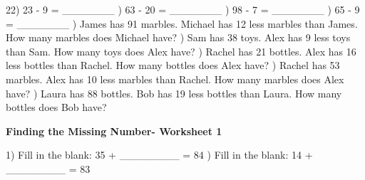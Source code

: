 \documentclass{article}%
\begin{document}
22) 23 {-} 9 = \_\_\_\_\_\_\_%
\newline%
\newline%
) 63 {-} 20 = \_\_\_\_\_\_\_%
\newline%
\newline%
) 98 {-} 7 = \_\_\_\_\_\_\_%
\newline%
\newline%
) 65 {-} 9 = \_\_\_\_\_\_\_%
\newline%
\newline%
) James has 91 marbles. Michael has 12 less marbles than James. How many marbles does Michael have?%
\newline%
\newline%
) Sam has 38 toys. Alex has 9 less toys than Sam. How many toys does Alex have?%
\newline%
\newline%
) Rachel has 21 bottles. Alex has 16 less bottles than Rachel. How many bottles does Alex have?%
\newline%
\newline%
) Rachel has 53 marbles. Alex has 10 less marbles than Rachel. How many marbles does Alex have?%
\newline%
\newline%
) Laura has 88 bottles. Bob has 19 less bottles than Laura. How many bottles does Bob have?%
\newline%
\newline%
\newline%
\pagebreak%
\large%
\begin{center}%
\textbf{Finding the Missing Number- Worksheet 1}%
\newline%
\newline%
\newline%
\end{center} \normalsize%
1) Fill in the blank: 35 + \_\_\_\_\_\_\_\_ = 84%
\newline%
\newline%
) Fill in the blank: 14 + \_\_\_\_\_\_\_\_ = 83%
\newline%
\newline%
\end{document}

